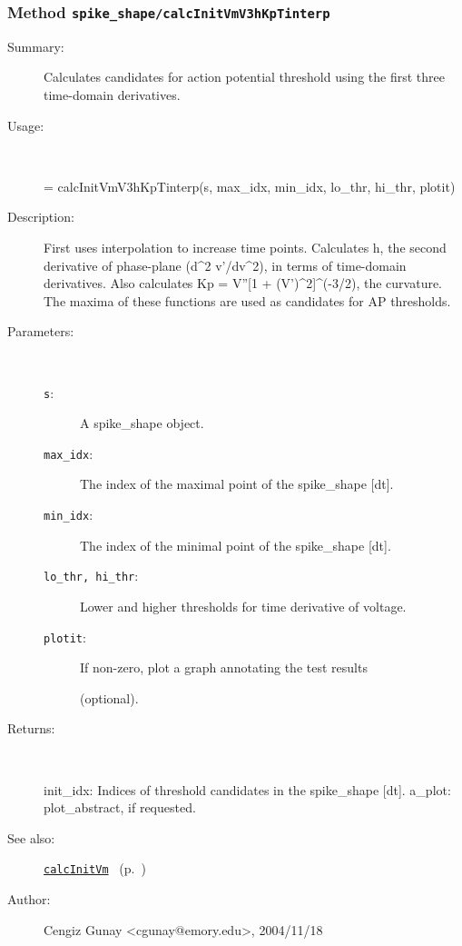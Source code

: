 \subsubsection[Method \texttt{calcInitVmV3hKpTinterp}]{Method \texttt{spike\_shape/calcInitVmV3hKpTinterp}}%
%
\label{ref_spike_shape__calcInitVmV3hKpTinterp}%
\hypertarget{ref_spike_shape__calcInitVmV3hKpTinterp}{}%
\begin{description}
\item[Summary:]Calculates candidates for action potential threshold using the first three time-domain derivatives.
%
\item[Usage:]~%
\begin{lyxcode}%
[init\_idx, a\_plot] = 
   calcInitVmV3hKpTinterp(s, max\_idx, min\_idx, lo\_thr, hi\_thr, plotit)
%
\end{lyxcode}%
%
\item[Description:]%
First uses interpolation to increase time points. Calculates h,
 the second derivative of phase-plane (d\textasciicircum{}2 v'/dv\textasciicircum{}2), in terms of 
 time-domain derivatives. Also calculates Kp = V''[1 + (V')\textasciicircum{}2]\textasciicircum{}(-3/2), 
 the curvature. The maxima of these functions are used as candidates 
 for AP thresholds.
\item[Parameters:]~
\begin{description}%
\item[\texttt{s}:]
 A spike\_shape object.
\item[\texttt{max\_idx}:]
 The index of the maximal point of the spike\_shape [dt].
\item[\texttt{min\_idx}:]
 The index of the minimal point of the spike\_shape [dt].
\item[\texttt{lo\_thr, hi\_thr}:]
 Lower and higher thresholds for time derivative of voltage.
\item[\texttt{plotit}:]
 If non-zero, plot a graph annotating the test results 

(optional).\end{description}%
%
\item[Returns:]~

	init\_idx: Indices of threshold candidates in the spike\_shape [dt].
	a\_plot: plot\_abstract, if requested.
%
%
\item[See also:]%
\hyperlink{ref_calcInitVm}{\texttt{calcInitVm}}%
\ (p.~\pageref{ref_calcInitVm})%
%
%
\item[Author:]%
Cengiz Gunay <cgunay@emory.edu>, 2004/11/18%
\end{description}
\methodline%
